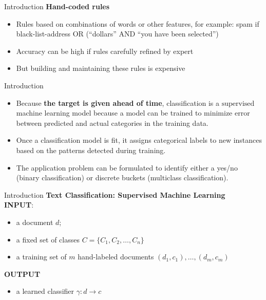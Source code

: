 \documentclass[11pt]{beamer}
\newcommand{\highlight}[1]{%
  \colorbox{yellow!100}{$\displaystyle#1$}}
\begin{document}
\begin{frame}{Introduction}
\textbf{Hand-coded rules}
\vspace{0.5cm}
\begin{itemize}
\item Rules based on combinations of words or other features, for example:
 spam if black-list-address OR (“dollars” AND “you have been selected”)
\item Accuracy can be high if rules carefully refined by expert
\item But building and maintaining these rules is expensive

\end{itemize}
\end{frame}
\begin{frame}{Introduction}
	\begin{itemize}
		\item Because \textbf{the target is given ahead of time}, classification is a \highlight{\text{supervised}} machine learning model because a model can be trained to minimize error between predicted and actual categories in the training data. 
		\item Once a classification model is fit, it assigns categorical labels to new instances based on the patterns detected during training.
		\item The application problem can be formulated to identify either a yes/no (binary classification) or discrete buckets (multiclass classification).
	\end{itemize}
\end{frame}
\begin{frame}{Introduction}
\textbf{Text Classification: Supervised Machine Learning}\\
\vspace{0.5cm}
\textbf{INPUT}:
\begin{itemize}
\item a document $d$;
\item a fixed set of classes $C=\{C_1, C_2, \dots, C_n \}$
\item a training set of $m$ hand-labeled documents $(d_1,c_1), \dots,(d_m,c_m)$
\end{itemize}
\vspace{0.5cm}
\textbf{OUTPUT}
\begin{itemize}
\item a learned classifier $\gamma:d \rightarrow c$
\end{itemize}
\end{frame}
\end{document}
